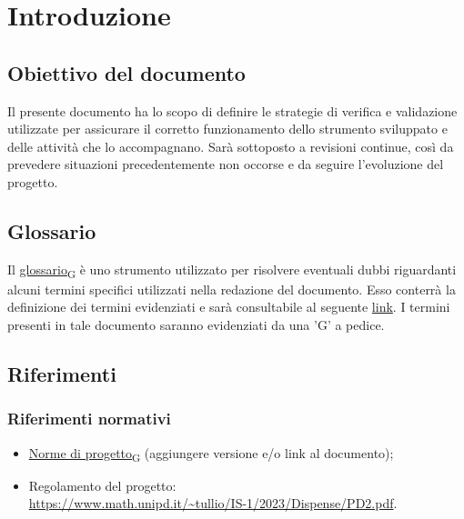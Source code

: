 \section{Introduzione}
\subsection{Obiettivo del documento}
Il presente documento ha lo scopo di definire le strategie di verifica e validazione utilizzate per assicurare il corretto funzionamento dello strumento sviluppato e delle
attività che lo accompagnano.  Sarà sottoposto a revisioni continue, così da prevedere situazioni precedentemente non occorse e da seguire l'evoluzione del progetto.
\subsection{Glossario}
Il \href{https://7last.github.io/docs/rtb/documentazione-interna/glossario\#glossario}{glossario\textsubscript{G}} è uno strumento utilizzato per risolvere eventuali dubbi riguardanti
alcuni termini specifici utilizzati nella redazione del documento.
Esso conterrà la definizione dei termini evidenziati e sarà consultabile al seguente \href{https://7last.github.io/docs/rtb/documentazione-interna/glossario}{link}. I termini presenti in tale documento saranno evidenziati da una 'G' a pedice.
\subsection{Riferimenti}
\subsubsection{Riferimenti normativi}
\begin{itemize}
    \item \href{https://7last.github.io/docs/rtb/documentazione-interna/glossario\#norme-di-progetto}{Norme di progetto\textsubscript{G}} (aggiungere versione e/o link al documento);
    \item Regolamento del progetto:\\
		  \url{https://www.math.unipd.it/~tullio/IS-1/2023/Dispense/PD2.pdf}.
\end{itemize}
